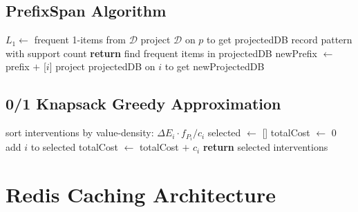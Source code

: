 \documentclass[conference]{IEEEtran}
\begin{document}
\subsection{PrefixSpan Algorithm}
\begin{algorithm}[H]
\caption{PrefixSpan for emission pattern mining}
\begin{algorithmic}[1]
  \State $L_1\gets$ frequent 1-items from $\mathcal{D}$
    \State project $\mathcal{D}$ on $p$ to get projectedDB
    \State {}
  \EndFor
\EndProcedure
\Statex
{}
    \State record pattern with support count
  \EndIf
    \State \textbf{return}
  \EndIf
  \State find frequent items in projectedDB
    \State newPrefix $\gets$ prefix $+$ [$i$]
    \State project projectedDB on $i$ to get newProjectedDB
    \State {}
  \EndFor
\EndProcedure
\end{algorithmic}
\end{algorithm}

\subsection{0/1 Knapsack Greedy Approximation}
\begin{algorithm}[H]
\caption{Greedy knapsack for intervention selection}
\begin{algorithmic}[1]
  \State sort interventions by value-density: $\Delta E_i \cdot f_{P_i} / c_i$
  \State selected $\gets$ []
  \State totalCost $\gets$ 0
      \State add $i$ to selected
      \State totalCost $\gets$ totalCost $+$ $c_i$
    \EndIf
  \EndFor
  \State \textbf{return} selected interventions
\EndProcedure
\end{algorithmic}
\end{algorithm}

\section{Redis Caching Architecture}
\end{document}

